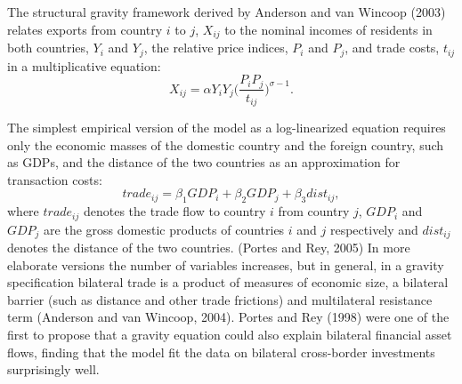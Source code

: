 \documentclass[12pt,a4paper]{article}
\begin{document}
The structural gravity framework derived by Anderson and van Wincoop (2003) relates exports from country $i$ to $j$, $X_{ij}$ to the nominal incomes of residents in both countries, $Y_i$ and $Y_j$, the relative price indices, $P_i$ and $P_j$, and trade costs, $t_{ij}$ in a multiplicative equation:
\begin{equation}
X_{ij} = \alpha Y_i Y_j \bigg( \frac{P_i P_j}{t_{ij}} \bigg)^{\sigma -1}.
\end{equation}

The simplest empirical version of the model as a log-linearized equation requires only the economic masses of the domestic country and the foreign country, such as GDPs, and the distance of the two countries as an approximation for transaction costs:
\begin{equation}
trade_{ij}=\beta_1GDP_i+\beta_2GDP_j+\beta_3dist_{ij},
\end{equation}
where $trade_{ij}$ denotes the trade flow to country $i$ from country $j$, $GDP_i$ and $GDP_j$ are the gross domestic products of countries $i$ and $j$ respectively and $dist_{ij}$ denotes the distance of the two countries. (Portes and Rey, 2005) In more elaborate versions the number of variables increases, but in general, in a gravity specification bilateral trade is a product of measures of economic size, a bilateral barrier (such as distance and other trade frictions) and multilateral resistance term (Anderson and van Wincoop, 2004). Portes and Rey (1998) were one of the first to propose that a gravity equation could also explain bilateral financial asset flows, finding that the model fit the data on bilateral cross-border investments surprisingly well.
\end{document}

